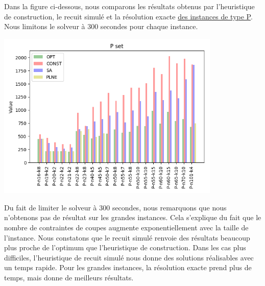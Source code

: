 Dans la figure ci-dessous, nous comparons les résultats obtenus par l'heuristique de construction, le recuit simulé et la résolution exacte \href{http://vrp.atd-lab.inf.puc-rio.br/index.php/en/}{des instances de type P}. Nous limitons le solveur à 300 secondes pour chaque instance.

\includegraphics[width=0.8\textwidth]{pictures/image1.png}

Du fait de limiter le solveur à 300 secondes, nous remarquons que nous n'obtenons pas de résultat sur les grandes instances. Cela s'explique du fait que le nombre de contraintes de coupes augmente exponentiellement avec la taille de l'instance. Nous constatons que le recuit simulé renvoie des résultats beaucoup plus proche de l'optimum que l'heuristique de construction. Dans les cas plus difficiles, l'heuristique de recuit simulé nous donne des solutions réalisables avec un temps rapide. Pour les grandes instances, la résolution exacte prend plus de temps, mais donne de meilleurs résultats.